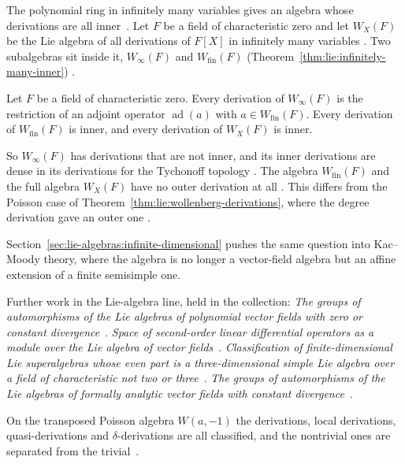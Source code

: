 The polynomial ring in infinitely many variables gives an algebra whose
derivations are all inner~\cite[p.~2]{BezushchakKashuba2025}. Let $F$ be a field of characteristic zero and let
$W_X(F)$ be the Lie algebra of all derivations of $F[X]$ in infinitely many
variables \cite[p.~1]{BezushchakKashuba2025}. Two subalgebras sit inside it,
$W_\infty(F)$ and $W_{\mathrm{fin}}(F)$
(Theorem~\ref{thm:lie:infinitely-many-inner})
\cite[p.~2]{BezushchakKashuba2025}.

\begin{theorem}\label{thm:lie:infinitely-many-inner}
Let $F$ be a field of characteristic zero. Every derivation of $W_\infty(F)$ is
the restriction of an adjoint operator $\operatorname{ad}(a)$ with
$a\in W_{\mathrm{fin}}(F)$. Every derivation of $W_{\mathrm{fin}}(F)$ is inner,
and every derivation of $W_X(F)$ is inner.
\end{theorem}

So $W_\infty(F)$ has derivations that are not inner, and its inner derivations
are dense in its derivations for the Tychonoff topology
\cite[p.~2]{BezushchakKashuba2025}. The algebra $W_{\mathrm{fin}}(F)$ and the
full algebra $W_X(F)$ have no outer derivation at all
\cite[p.~2]{BezushchakKashuba2025}. This differs from the Poisson case of
Theorem~\ref{thm:lie:wollenberg-derivations}, where the degree derivation gave
an outer one \cite[Lemma~1, p.~316]{Wollenberg1969}.

Section~\ref{sec:lie-algebras:infinite-dimensional}
pushes the same question into Kac--Moody theory, where the algebra is no
longer a vector-field algebra but an affine extension of a finite
semisimple one.

Further work in the Lie-algebra line, held in the collection:
\noindent\emph{The groups of automorphisms of the Lie algebras of polynomial
vector fields with zero or constant
divergence}~\cite{LibTheGroupsOfAutomorphisms2017}. \noindent\emph{Space of
second-order linear differential operators as a module over the Lie algebra of
vector fields}~\cite{LibSpaceOfSecondOrder1997}. \noindent\emph{Classification
of finite-dimensional Lie superalgebras whose even part is a three-dimensional
simple Lie algebra over a field of characteristic not two or
three}~\cite{LibClassificationOfFiniteDimensional2019}. \noindent\emph{The
groups of automorphisms of the Lie algebras of formally analytic vector fields
with constant divergence}~\cite{LibTheGroupsOfAutomorphisms2014}.

On the transposed Poisson algebra $W(a,-1)$ the derivations, local
derivations, quasi-derivations and $\delta$-derivations are all classified,
and the nontrivial ones are separated from the
trivial~\cite{WlTransposedPoissonStructure2026}.

